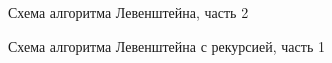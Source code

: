 \begin{figure}
	\caption{Схема алгоритма Левенштейна, часть 2}
\end{figure}

\begin{figure}
	\caption{Схема алгоритма Левенштейна с рекурсией, часть 1}
\end{figure}

